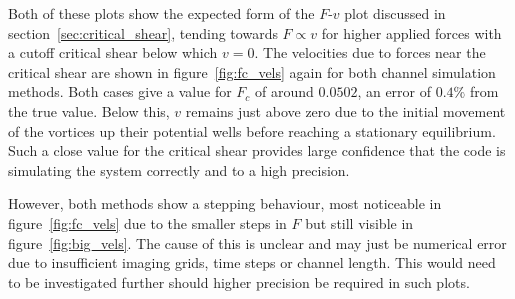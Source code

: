 \documentclass{article}
\numberwithin{equation}{section}
\begin{document}
Both of these plots show the expected form of the $F$-$v$ plot discussed in section~\ref{sec:critical_shear}, tending towards $F\propto v$ for higher applied forces with a cutoff critical shear below which $v=0$. The velocities due to forces near the critical shear are shown in figure~\ref{fig:fc_vels} again for both channel simulation methods. Both cases give a value for $F_c$ of around $0.0502$, an error of $0.4\%$ from the true value. Below this, $v$ remains just above zero due to the initial movement of the vortices up their potential wells before reaching a stationary equilibrium. Such a close value for the critical shear provides large confidence that the code is simulating the system correctly and to a high precision.

However, both methods show a stepping behaviour, most noticeable in figure~\ref{fig:fc_vels} due to the smaller steps in $F$ but still visible in figure~\ref{fig:big_vels}. The cause of this is unclear and may just be numerical error due to insufficient imaging grids, time steps or channel length. This would need to be investigated further should higher precision be required in such plots.
\end{document}
